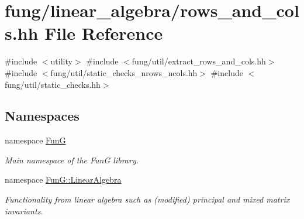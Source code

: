 \hypertarget{rows__and__cols_8hh}{\section{fung/linear\-\_\-algebra/rows\-\_\-and\-\_\-cols.hh \-File \-Reference}
\label{rows__and__cols_8hh}
}
{\ttfamily \#include $<$utility$>$}\*
{\ttfamily \#include $<$fung/util/extract\-\_\-rows\-\_\-and\-\_\-cols.\-hh$>$}\*
{\ttfamily \#include $<$fung/util/static\-\_\-checks\-\_\-nrows\-\_\-ncols.\-hh$>$}\*
{\ttfamily \#include $<$fung/util/static\-\_\-checks.\-hh$>$}\*
\subsection*{\-Namespaces}
\begin{DoxyCompactItemize}
\item 
namespace \hyperlink{namespaceFunG}{\-Fun\-G}
\begin{DoxyCompactList}\small\item\em \-Main namespace of the \-Fun\-G library. \end{DoxyCompactList}\item 
namespace \hyperlink{namespaceFunG_1_1LinearAlgebra}{\-Fun\-G\-::\-Linear\-Algebra}
\begin{DoxyCompactList}\small\item\em \-Functionality from linear algebra such as (modified) principal and mixed matrix invariants. \end{DoxyCompactList}\end{DoxyCompactItemize}
